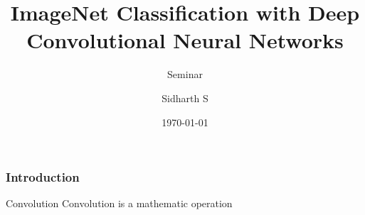 \documentclass[aspectratio=169, 10pt]{beamer}
\title{ImageNet Classification with Deep Convolutional
Neural Networks}
\author{Sidharth S}
\subtitle{Seminar}
\date{\today}
\institute{Rajagiri School of Engineering and Technology}
\begin{document}
\maketitle %

\begin{frame}
\frametitle{Introduction}

\begin{block}{Convolution}
Convolution is a mathematic operation

\end{block}

\end{frame}
\end{document}
